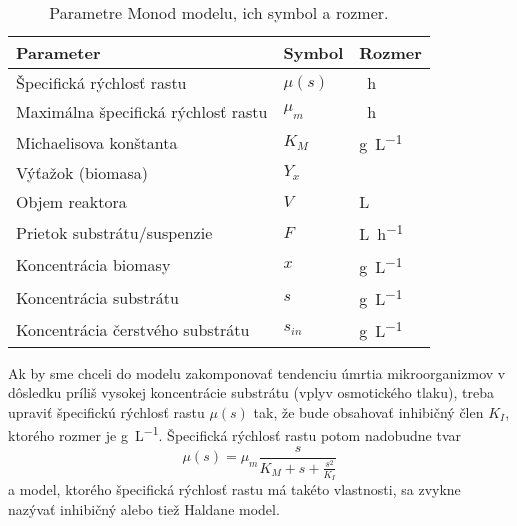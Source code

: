 \begin{table}
	\centering
	\caption{Parametre Monod modelu, ich symbol a rozmer.}
	\label{tab:monod_params}
	\begin{tabular}{lll}
		\hline
		\textbf{Parameter} & \textbf{Symbol} & \textbf{Rozmer} \\
		\hline
		Špecifická rýchlosť rastu & $\mu(s)$ & \si{\per\hour} \\
		Maximálna špecifická rýchlosť rastu & $\mu_{m}$ & \si{\per\hour} \\
		Michaelisova konštanta & $K_{M}$ & \si{\gram\per\liter} \\
		Výťažok (biomasa) & $Y_{x}$ & \\
		Objem reaktora & $V$ & \si{\liter} \\
		Prietok substrátu/suspenzie & $F$ & \si{\liter\per\hour} \\
		Koncentrácia biomasy & $x$ & \si{\gram\per\liter} \\
		Koncentrácia substrátu & $s$ & \si{\gram\per\liter} \\
		Koncentrácia čerstvého substrátu & $s_{in}$ & \si{\gram\per\liter} \\
		\hline
	\end{tabular}
\end{table}

Ak by sme chceli do modelu zakomponovať tendenciu úmrtia mikroorganizmov v dôsledku príliš vysokej koncentrácie substrátu (vplyv osmotického tlaku), treba upraviť špecifickú rýchlosť rastu $\mu(s)$ tak, že bude obsahovať inhibičný člen $ K_I $, ktorého rozmer je \si{\gram\per\liter}. Špecifická rýchlosť rastu potom nadobudne tvar
\begin{equation}
	\mu(s) = \mu_{m}\frac{s}{K_{M} + s + \frac{s^2}{K_I}} \label{eq:spec_growth_rate_Haldane}
\end{equation}
a model, ktorého špecifická rýchlosť rastu má takéto vlastnosti, sa zvykne nazývať inhibičný alebo tiež Haldane model. 